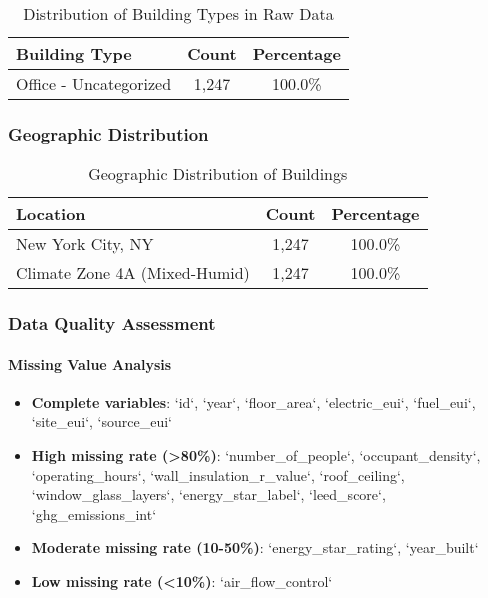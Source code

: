 \begin{table}[h]
\centering
\caption{Distribution of Building Types in Raw Data}
\begin{tabular}{|l|c|c|}
\hline
\textbf{Building Type} & \textbf{Count} & \textbf{Percentage} \\
\hline
Office - Uncategorized & 1,247 & 100.0\% \\
\hline
\end{tabular}
\end{table}

\subsubsection{Geographic Distribution}

\begin{table}[h]
\centering
\caption{Geographic Distribution of Buildings}
\begin{tabular}{|l|c|c|}
\hline
\textbf{Location} & \textbf{Count} & \textbf{Percentage} \\
\hline
New York City, NY & 1,247 & 100.0\% \\
\hline
Climate Zone 4A (Mixed-Humid) & 1,247 & 100.0\% \\
\hline
\end{tabular}
\end{table}

\subsubsection{Data Quality Assessment}

\paragraph{Missing Value Analysis}
\begin{itemize}
    \item \textbf{Complete variables}: `id`, `year`, `floor\_area`, `electric\_eui`, `fuel\_eui`, `site\_eui`, `source\_eui`
    \item \textbf{High missing rate (>80\%)}: `number\_of\_people`, `occupant\_density`, `operating\_hours`, `wall\_insulation\_r\_value`, `roof\_ceiling`, `window\_glass\_layers`, `energy\_star\_label`, `leed\_score`, `ghg\_emissions\_int`
    \item \textbf{Moderate missing rate (10-50\%)}: `energy\_star\_rating`, `year\_built`
    \item \textbf{Low missing rate (<10\%)}: `air\_flow\_control`
\end{itemize}


